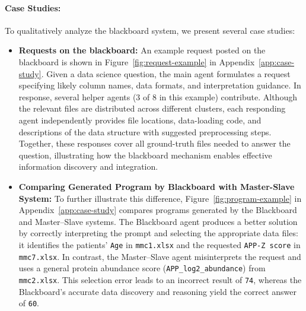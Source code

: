 \paragraph{Case Studies:}

To qualitatively analyze the blackboard system, we present several case studies:
\begin{itemize}[leftmargin=*, nosep]

\item \textbf{Requests on the blackboard:} An example request posted on the blackboard is shown in Figure~\ref{fig:request-example} in Appendix~\ref{app:case-study}. Given a data science question, the main agent formulates a request specifying likely column names, data formats, and interpretation guidance. In response, several helper agents (3 of 8 in this example) contribute. Although the relevant files are distributed across different clusters, each responding agent independently provides file locations, data-loading code, and descriptions of the data structure with suggested preprocessing steps. Together, these responses cover all ground-truth files needed to answer the question, illustrating how the blackboard mechanism enables effective information discovery and integration.

\item \textbf{Comparing Generated Program by Blackboard with Master-Slave System:} To further illustrate this difference, Figure~\ref{fig:program-example} in Appendix~\ref{app:case-study} compares programs generated by the Blackboard and Master--Slave systems. The Blackboard agent produces a better solution by correctly interpreting the prompt and selecting the appropriate data files: it identifies the patients' \texttt{Age} in \texttt{mmc1.xlsx} and the requested \texttt{APP-Z score} in \texttt{mmc7.xlsx}. In contrast, the Master--Slave agent misinterprets the request and uses a general protein abundance score (\texttt{APP\_log2\_abundance}) from \texttt{mmc2.xlsx}. This selection error leads to an incorrect result of \texttt{74}, whereas the Blackboard's accurate data discovery and reasoning yield the correct answer of \texttt{60}.


\end{itemize}
